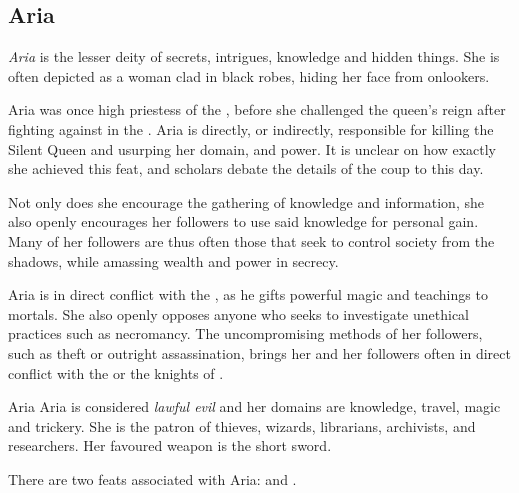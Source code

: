 \subsection{Aria}
\label{sec:Aria}

\emph{Aria} is the lesser deity of secrets, intrigues, knowledge and hidden
things. She is often depicted as a woman clad in black robes, hiding her face
from onlookers.

Aria was once high priestess of the , before she
challenged the queen's reign after fighting against 
in the . Aria is directly, or indirectly,
responsible for killing the Silent Queen and usurping her domain, and
power. It is unclear on how exactly she achieved this feat, and scholars
debate the details of the coup to this day.

Not only does she encourage the gathering of knowledge and information, she
also openly encourages her followers to use said knowledge for personal gain.
Many of her followers are thus often those that seek to control society from
the shadows, while amassing wealth and power in secrecy.

Aria is in direct conflict with the , as he gifts
powerful magic and teachings to mortals. She also openly opposes anyone who
seeks to investigate unethical practices such as necromancy. The
uncompromising methods of her followers, such as theft or outright
assassination, brings her and her followers often in direct conflict with the
 or the knights of .

\begin{35e}{Aria}
  Aria is considered \emph{lawful evil} and her domains are knowledge, travel,
  magic and trickery. She is the patron of thieves, wizards, librarians,
  archivists, and researchers. Her favoured weapon is the short sword.

  There are two feats associated with Aria:  and
  .
\end{35e}
